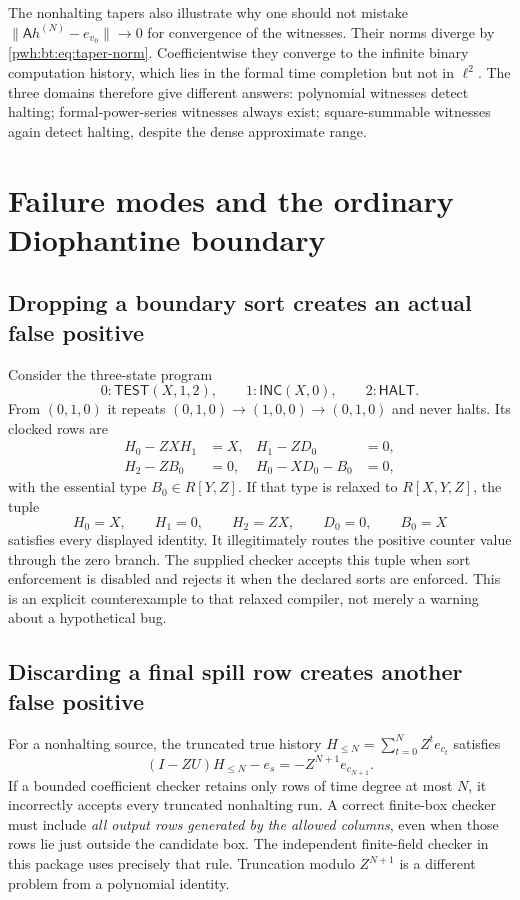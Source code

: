 \documentclass[11pt,letterpaper]{article}
\numberwithin{equation}{section}
\theoremstyle{definition}
\newcommand{\inc}{\mathsf{INC}}
\newcommand{\test}{\mathsf{TEST}}
\newcommand{\halt}{\mathsf{HALT}}
\newcommand{\Ann}{\mathsf{A}}
\begin{document}
The nonhalting tapers also illustrate why one should not mistake
$\|\Ann h^{(N)}-e_{v_0}\|\to0$ for convergence of the witnesses.
Their norms diverge by \eqref{pwh:bt:eq:taper-norm}. Coefficientwise they
converge to the infinite binary computation history, which lies in the
formal time completion but not in $\ell^2$. The three domains therefore
give different answers: polynomial witnesses detect halting;
formal-power-series witnesses always exist; square-summable witnesses
again detect halting, despite the dense approximate range.

\section{Failure modes and the ordinary Diophantine boundary}\label{pwh:bt:sec:limits}

\subsection{Dropping a boundary sort creates an actual false positive}
Consider the three-state program
\[
 0:\test(X,1,2),\qquad1:\inc(X,0),\qquad2:\halt.
\]
From $(0,1,0)$ it repeats
$(0,1,0)\to(1,0,0)\to(0,1,0)$ and never halts. Its clocked rows are
\begin{align*}
 H_0-ZXH_1&=X,& H_1-ZD_0&=0,\\
 H_2-ZB_0&=0,&H_0-XD_0-B_0&=0,
\end{align*}
with the essential type $B_0\in R[Y,Z]$. If that type is relaxed to
$R[X,Y,Z]$, the tuple
\begin{equation}\label{pwh:bt:eq:fake}
 H_0=X,\qquad H_1=0,\qquad H_2=ZX,\qquad D_0=0,\qquad B_0=X
\end{equation}
satisfies every displayed identity. It illegitimately routes the
positive counter value through the zero branch. The supplied checker
accepts this tuple when sort enforcement is disabled and rejects it
when the declared sorts are enforced. This is an explicit counterexample
to that relaxed compiler, not merely a warning about a hypothetical bug.

\subsection{Discarding a final spill row creates another false positive}
For a nonhalting source, the truncated true history
$H_{\le N}=\sum_{t=0}^NZ^te_{c_t}$ satisfies
\[
 (I-ZU)H_{\le N}-e_s=-Z^{N+1}e_{c_{N+1}}.
\]
If a bounded coefficient checker retains only rows of time degree at
most $N$, it incorrectly accepts every truncated nonhalting run. A
correct finite-box checker must include \emph{all output rows generated
by the allowed columns}, even when those rows lie just outside the
candidate box. The independent finite-field checker in this package
uses precisely that rule. Truncation modulo $Z^{N+1}$ is a different
problem from a polynomial identity.
\end{document}
